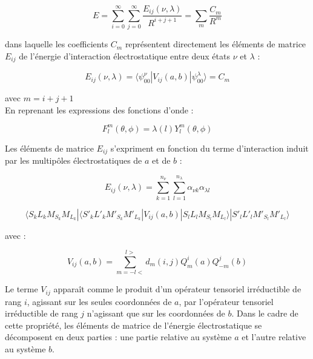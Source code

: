 	\begin{equation}
	E = \sum_{i=0}^{\infty} \sum_{j=0}^{\infty} \frac{E_{ij} (\nu,\lambda)}{R^{i+j+1}} = \sum_{m} \frac{C_{m}}{R^{m}}
	\end{equation}
	
	\noindent dans laquelle les coefficients $C_{m}$ représentent directement les éléments de matrice $E_{ij}$ de l'énergie d'interaction électrostatique entre deux états $\nu$ et $\lambda$ : 
	
	\begin{equation}
	E_{ij}(\nu, \lambda) = \langle \psi_{00}^{\nu}|V_{ij}(a,b)|\psi_{00}^{\lambda} \rangle = C_{m}
	\end{equation}
	
	\noindent avec $m= i+j+1$ \\
	En reprenant les expressions des fonctions d'onde :
	
	\begin{equation}
	F_{l}^{m} (\theta,\phi) = \lambda (l)Y_{l}^{m} (\theta,\phi)
	\end{equation}
	
	Les éléments de matrice $E_{ij}$ s'expriment en fonction du terme d'interaction induit par les multipôles électrostatiques de $a$ et de $b$ : 
	
	\begin{equation*}
	E_{ij} (\nu , \lambda) = \sum_{k=1}^{n_{\nu}} \sum_{l=1}^{n_{\lambda}} \alpha_{\nu k} \alpha_{\lambda l}
	\end{equation*}
	
	\begin{equation}
	\langle S_{k}L_{k}M_{S_{k}}M_{L_{k}}|\langle S'_{k}L'_{k}M'_{S_{k}}M'_{L_{k}}| V_{ij}(a,b)| S_{l}L_{l}M_{S_{l}} M_{L_{l}} \rangle| S'_{l}L'_{l}M'_{S_{l}}M'_{L_{l}} \rangle
	\end{equation}
	
	\noindent avec : 
	
	\begin{equation}
	V_{ij}(a,b) = \sum_{m=-l<}^{l>} d_{m}(i,j) Q_{m}^{i}(a) Q_{-m}^{j}(b) 
	\end{equation}
	
	Le terme $V_{ij}$ apparaît comme le produit d'un opérateur tensoriel irréductible de rang $i$, agissant sur les seules coordonnées de $a$, par l'opérateur tensoriel irréductible de rang $j$ n'agissant que sur les coordonnées de $b$. Dans le cadre de cette propriété, les éléments de matrice de l'énergie électrostatique se décomposent en deux parties : une partie relative au système $a$ et l'autre relative au système $b$. 
	

